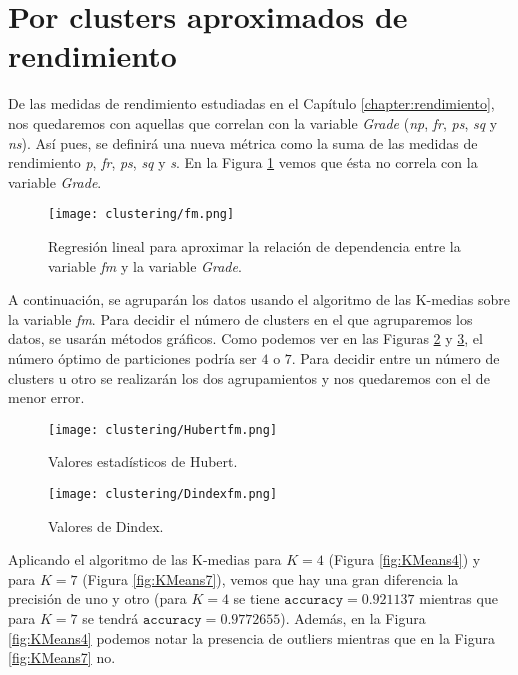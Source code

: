 \section{Por clusters aproximados de rendimiento}

De las medidas de rendimiento estudiadas en el Capítulo \ref{chapter:rendimiento}, nos quedaremos con aquellas que correlan con la variable \emph{Grade} (\emph{np}, \emph{fr}, \emph{ps}, \emph{sq} y \emph{ns}). Así pues, se definirá una nueva métrica como la suma de las medidas de rendimiento \emph{p}, \emph{fr}, \emph{ps}, \emph{sq} y \emph{s}. En la Figura \ref{fig:correlationfm} vemos que ésta no correla con la variable \emph{Grade}.

\begin{figure}[H]
    \centering
    \texttt{[image: clustering/fm.png]}
    \caption{Regresión lineal para aproximar la relación de dependencia entre la variable \emph{fm} y la variable \emph{Grade}.}
    \label{fig:correlationfm}
\end{figure}

A continuación, se agruparán los datos usando el algoritmo de las K-medias sobre la variable \emph{fm}. Para decidir el número de clusters en el que agruparemos los datos, se usarán métodos gráficos. Como podemos ver en las Figuras \ref{fig:indiceshubertfm} y \ref{fig:indicesdindexfm}, el número óptimo de particiones podría ser $4$ o $7$. Para decidir entre un número de clusters u otro se realizarán los dos agrupamientos y nos quedaremos con el de menor error.

\begin{figure}[H]
    \centering
    \texttt{[image: clustering/Hubertfm.png]}
    \caption{Valores estadísticos de Hubert.}
    \label{fig:indiceshubertfm}
\end{figure}

\begin{figure}[H]
    \centering
    \texttt{[image: clustering/Dindexfm.png]}
    \caption{Valores de Dindex.}
    \label{fig:indicesdindexfm}
\end{figure}

Aplicando el algoritmo de las K-medias para $K = 4$ (Figura \ref{fig:KMeans4}) y para $K = 7$ (Figura \ref{fig:KMeans7}), vemos que hay una gran diferencia la precisión de uno y otro (para $K = 4$ se tiene $\texttt{accuracy} = 0.921137$ mientras que para $K = 7$ se tendrá $\texttt{accuracy} = 0.9772655$). Además, en la Figura \ref{fig:KMeans4} podemos notar la presencia de outliers mientras que en la Figura \ref{fig:KMeans7} no.

